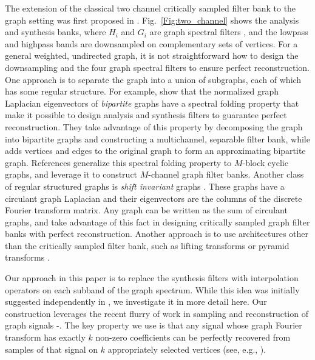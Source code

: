 \documentclass[journal, 10pt]{IEEEtran}
\begin{document}
The extension of the classical two channel critically sampled filter bank to the graph setting was first proposed in \cite{narang_icip}. Fig.\ \ref{Fig:two_channel} shows the analysis and synthesis banks, where $H_i$ and $G_i$ are graph spectral filters \cite{shuman2013emerging}, and the lowpass and highpass bands are downsampled on complementary sets of vertices. For a general weighted, undirected graph, it is not straightforward %
how to design the downsampling and the four graph spectral filters to ensure perfect reconstruction. One approach is to separate the graph into a union of subgraphs, each of which has some regular structure. For example, \cite{narang2012perfect,narang_bior_filters} show that the normalized graph Laplacian eigenvectors of \emph{bipartite} graphs have a spectral folding property that make it possible to design analysis and synthesis filters to guarantee perfect reconstruction. They take advantage of this property by decomposing the graph into bipartite graphs and constructing a multichannel, separable filter bank, while \cite{sakiyama} adds vertices and edges to the original graph to form an approximating bipartite graph. References \cite{teke2016,teke2017ii} generalize this spectral folding property to $M$-block cyclic graphs, and leverage it to construct $M$-channel graph filter banks. Another class of regular structured graphs is \emph{shift invariant} graphs \cite[Chapter 5.1]{grady}. These graphs have a circulant graph Laplacian and their eigenvectors are the columns of the discrete Fourier transform matrix. Any graph can be written as the sum of circulant graphs, and \cite{ekambaram_icip,ekambaram2013globalsip,kotzagiannidis2016icassp} take advantage of this fact in designing critically sampled graph filter banks with perfect reconstruction. Another approach is to use architectures other than the critically sampled filter bank, such as lifting transforms \cite{jansen,narang_lifting_graphs} or pyramid transforms \cite{shuman_TSP_multiscale}.

Our approach in this paper is to replace the synthesis filters with interpolation operators on each subband of the graph spectrum. While this idea was initially suggested independently in \cite{chen2015discrete}, we investigate it in more detail here. Our construction leverages the recent flurry of work in sampling and reconstruction of graph signals \cite{chen2015discrete}-\nocite{pesenson_paley,narang2013interpolation,anis2014towards,gadde2015probabilistic,shomorony,PuyTGV15,chen2015signal,tsitsvero2016uncertainty}\cite{anis2016efficient}. The key property we use is that any signal whose graph Fourier transform has exactly $k$ non-zero coefficients can be perfectly recovered from samples of that signal on $k$ appropriately selected vertices (see, e.g., \cite[Theorem 1]{chen2015discrete} \cite[Proposition 1]{anis2016efficient}).
\end{document}
